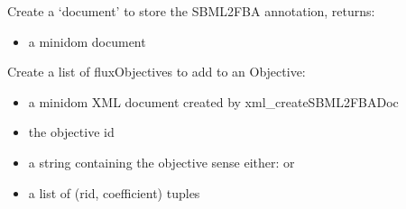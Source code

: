 \documentclass[letterpaper,10pt,english]{sphinxmanual}
\begin{document}

\begin{fulllineitems}
\label{\detokenize{modules_doc:cbmpy.CBXML.xml_createSBML2FBADoc}}
\pysigstartsignatures
{}
\pysigstopsignatures
\sphinxAtStartPar
Create a ‘document’ to store the SBML2FBA annotation, returns:
\begin{itemize}
\item {} 
\sphinxAtStartPar
{} a minidom document

\end{itemize}

\end{fulllineitems}


\begin{fulllineitems}
\label{\detokenize{modules_doc:cbmpy.CBXML.xml_createSBML2FBAObjective}}
\pysigstartsignatures
{}
\pysigstopsignatures
\sphinxAtStartPar
Create a list of fluxObjectives to add to an Objective:
\begin{itemize}
\item {} 
\sphinxAtStartPar
{} a minidom XML document created by xml\_createSBML2FBADoc

\item {} 
\sphinxAtStartPar
{} the objective id

\item {} 
\sphinxAtStartPar
{} a string containing the objective sense either:  or 

\item {} 
\sphinxAtStartPar
{} a list of (rid, coefficient) tuples

\end{itemize}

\end{fulllineitems}
\end{document}
